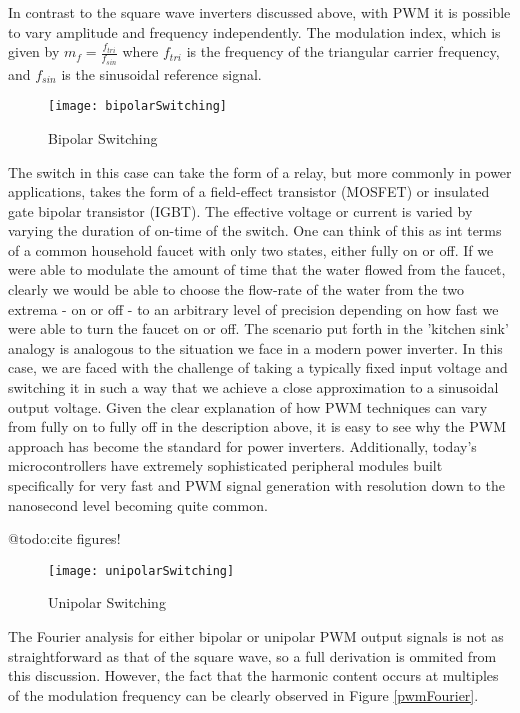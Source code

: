 In contrast to the square wave inverters discussed above, with PWM it is possible to vary amplitude and frequency independently. The modulation index, which is given by $m_f=\frac{f_{tri}}{f_{sin}}$ where $f_{tri}$ is the frequency of the triangular carrier frequency, and $f_{sin}$ is the sinusoidal reference signal. 

\begin{figure}[h]
\centering
\texttt{[image: bipolarSwitching]}
\caption{Bipolar Switching}
\label{bipolar}
\end{figure}

The switch in this case can take the form of a relay, but more commonly in power applications, takes the form of a field-effect transistor (MOSFET) or insulated gate bipolar transistor (IGBT). The effective voltage or current is varied by varying the duration of on-time of the switch. One can think of this as int terms of a common household faucet with only two states, either fully on or off. If we were able to modulate the amount of time that the water flowed from the faucet, clearly we would be able to choose the flow-rate of the water from the two extrema - on or off - to an arbitrary level of precision depending on how fast we were able to turn the faucet on or off. The scenario put forth in the 'kitchen sink' analogy is analogous to the situation we face in a modern power inverter. In this case, we are faced with the challenge of taking a typically fixed input voltage and switching it in such a way that we achieve a close approximation to a sinusoidal output voltage. Given the clear explanation of how PWM techniques can vary from fully on to fully off in the description above, it is easy to see why the PWM approach has become the standard for power inverters. Additionally, today's microcontrollers have extremely sophisticated peripheral modules built specifically for very fast and PWM signal generation with resolution down to the nanosecond level becoming quite common. 

@todo:cite figures!
\begin{figure}[h]
\centering
\texttt{[image: unipolarSwitching]}
\caption{Unipolar Switching}
\label{unipolar}
\end{figure}

The Fourier analysis for either bipolar or unipolar PWM output signals is not as straightforward as that of the square wave, so a full derivation is ommited from this discussion. However, the fact that the harmonic content occurs at multiples of the modulation frequency can be clearly observed in Figure \ref{pwmFourier}. 

